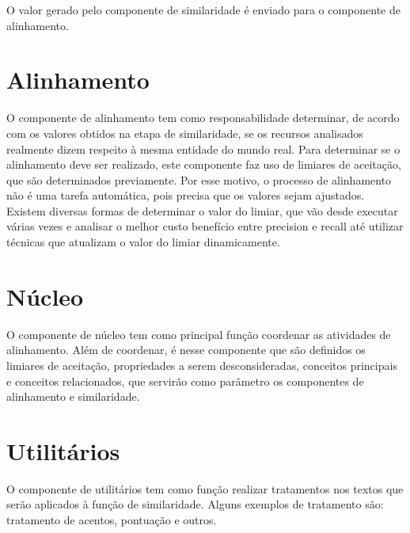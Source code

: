 O valor gerado pelo componente de similaridade é enviado para o componente de alinhamento.
\section*{Alinhamento}
O componente de alinhamento tem como responsabilidade determinar, de acordo com os valores obtidos na etapa de similaridade, se os recursos analisados realmente dizem respeito à mesma entidade do mundo real. Para determinar se o alinhamento deve ser realizado, este componente faz uso de limiares de aceitação, que são determinados previamente. Por esse motivo, o processo de alinhamento não é uma tarefa automática, pois precisa que os valores sejam ajustados. Existem diversas formas de determinar o valor do limiar, que vão desde executar várias vezes e analisar o melhor custo benefício entre precision e recall até utilizar técnicas que atualizam o valor do limiar dinamicamente.


\section*{Núcleo}
O componente de núcleo tem como principal função coordenar as atividades de alinhamento. Além de coordenar, é nesse componente que são definidos os limiares de aceitação, propriedades a serem desconsideradas, conceitos principais e conceitos relacionados, que servirão como parâmetro os componentes de alinhamento e similaridade.


\section*{Utilitários}
O componente de utilitários tem como função realizar tratamentos nos textos que serão aplicados à função de similaridade. Alguns exemplos de tratamento são: tratamento de acentos, pontuação e outros.


